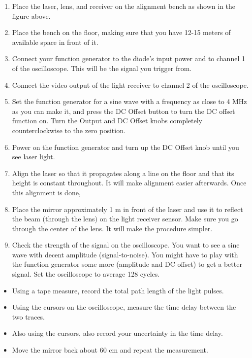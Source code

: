 \documentclass[11pt]{article}
\begin{document}
\begin{enumerate}
  
\item Place the laser, lens, and receiver on the alignment bench as shown in the
figure above.
  
\item Place the bench on the floor, making sure that you have 12-15 meters of
available space in front of it.

\item Connect your function generator to the diode's input power and to channel
1 of the oscilloscope. This will be the signal you trigger from.

\item Connect the video output of the light receiver to channel 2 of the
oscilloscope.

\item Set the function generator for a sine wave with a frequency as close to 4
MHz as you can make it, and press the DC Offset button to turn the DC offset
function on. Turn the Output and DC Offset knobs completely counterclockwise to
the zero position.

\item Power on the function generator and turn up the DC Offset knob until you
see laser light.
  
\item Align the laser so that it propagates along a line on the floor and that
its height is constant throughout. It will make alignment easier afterwards.
Once this alignment is done,

\item Place the mirror approximately 1 m in front of the laser and use it to
reflect the beam (through the lens) on the light receiver sensor. Make sure you
go through the center of the lens. It will make the procedure simpler.

\item Check the strength of the signal on the oscilloscope. You want to see a
sine wave with decent amplitude (signal-to-noise). You might have to play with
the function generator some more (amplitude and DC offset) to get a better
signal. Set the oscilloscope to average 128 cycles.
  
\end{enumerate}

\vspace{5mm}


\begin{itemize}
\item Using a tape measure, record the total path length of the light pulses.

\item Using the cursors on the oscilloscope, measure the time delay between the
two traces.

\item Also using the cursors, also record your uncertainty in the time delay.

\item Move the mirror back about 60 cm and repeat the measurement.
\end{itemize}
\end{document}
